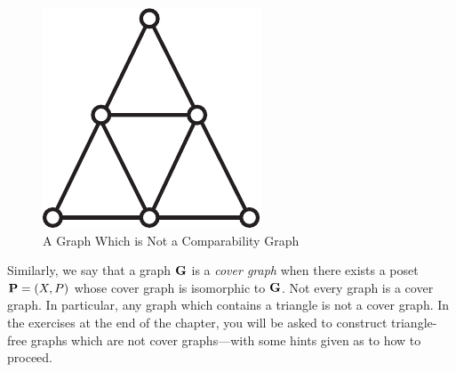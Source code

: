 \begin{figure}
\begin{center}
\includegraphics*[scale=.4]{posets-figs/noncompgraph.pdf}
\caption{\label{fig:noncompgraph}A Graph Which is Not a Comparability Graph}
\end{center}
\end{figure}

Similarly, we say that a graph $\mathbf{G}$ is a \emph{cover graph} when there
exists a poset $\mathbf{P}=(X,P)$ whose cover graph is isomorphic to $\mathbf{G}$.  Not
every graph is a cover graph.  In particular, any graph which contains
a triangle is not a cover graph.  In the exercises at the end of the
chapter, you will be asked to construct triangle-free graphs which are
not cover graphs---with some hints given as to how to proceed.

